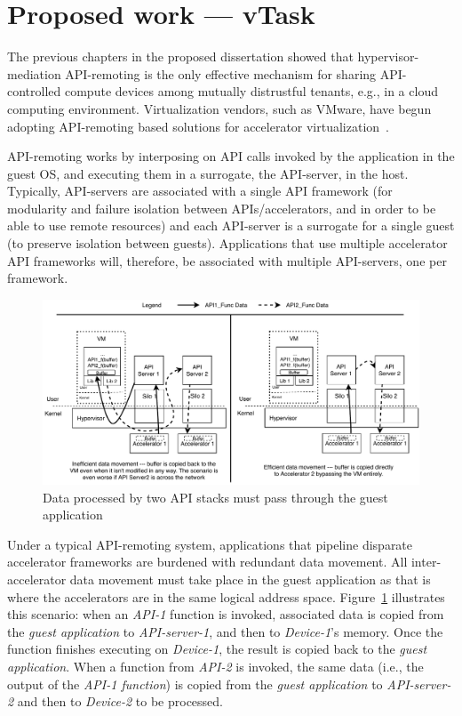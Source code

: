 \section{Proposed work --- vTask}
\label{sec:vTask}

The previous chapters in the proposed dissertation showed that
hypervisor-mediation API-remoting is the only effective mechanism for sharing
API-controlled compute devices among mutually distrustful tenants, e.g., in a
cloud computing environment. Virtualization vendors, such as VMware, have
begun adopting API-remoting based solutions for accelerator virtualization~\cite{bitfusion-acquisition}.

API-remoting works by interposing on API calls invoked by the application in
the guest OS, and executing them in a surrogate, the API-server, in the host.
Typically, API-servers are associated with a single API framework (for
modularity and failure isolation between APIs/accelerators, and in order to be
able to use remote resources) and each API-server is a surrogate for a single
guest (to preserve isolation between guests). Applications that use multiple
accelerator API frameworks will, therefore, be associated with multiple
API-servers, one per framework.

\begin{figure}[ht!]
\centering
\captionsetup{justification=centering,width=\linewidth}
\includegraphics[width=\linewidth]{figures/vtask-overview.pdf}
\caption{Data processed by two API stacks must pass through the guest application}
\label{fig:overview}
\end{figure}

Under a typical API-remoting system, applications that pipeline disparate accelerator frameworks are burdened with redundant data movement. All inter-accelerator data movement must take place in the guest application as that is where the accelerators are in the same logical address space. Figure~\ref{fig:overview} illustrates this scenario: when an \emph{API-1} function is invoked, associated data is copied from the \emph{guest application} to \emph{API-server-1}, and then to \emph{Device-1}’s memory. Once the function finishes executing on \emph{Device-1}, the result is copied back to the \emph{guest application}. When a function from \emph{API-2} is invoked, the same data (i.e., the output of the \emph{API-1 function}) is copied from the \emph{guest application} to \emph{API-server-2} and then to \emph{Device-2} to be processed.

